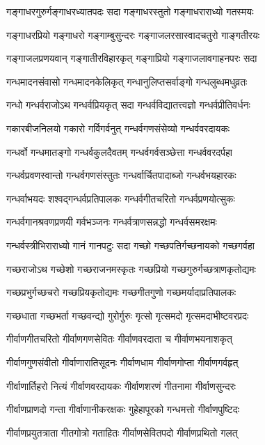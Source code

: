 \twolineshloka
{गङ्गाधरगुरुर्गङ्गाधरध्यातपदः सदा}
{गङ्गाधरस्तुतो गङ्गाधराराध्यो गतस्मयः}%

\twolineshloka
{गङ्गाधरप्रियो गङ्गाधरो गङ्गाम्बुसुन्दरः}%
{गङ्गाजलरसास्वादचतुरो गाङ्गतीरयः}%

\twolineshloka
{गङ्गाजलप्रणयवान् गङ्गातीरविहारकृत्}%
{गङ्गाप्रियो गङ्गाजलावगाहनपरः सदा}%

\twolineshloka
{गन्धमादनसंवासो गन्धमादनकेलिकृत्}%
{गन्धानुलिप्तसर्वाङ्गो गन्धलुब्धमधुव्रतः}%

\twolineshloka
{गन्धो गन्धर्वराजोऽथ गन्धर्वप्रियकृत् सदा}%
{गन्धर्वविद्यातत्त्वज्ञो गन्धर्वप्रीतिवर्धनः}%

\twolineshloka
{गकारबीजनिलयो गकारो गर्विगर्वनुत्}%
{गन्धर्वगणसंसेव्यो गन्धर्ववरदायकः}%

\twolineshloka
{गन्धर्वो गन्धमातङ्गो गन्धर्वकुलदैवतम्}%
{गन्धर्वगर्वसञ्छेत्ता गन्धर्ववरदर्पहा}%

\twolineshloka
{गन्धर्वप्रवणस्वान्तो गन्धर्वगणसंस्तुतः}%
{गन्धर्वार्चितपादाब्जो गन्धर्वभयहारकः}%

\twolineshloka
{गन्धर्वाभयदः शश्वद्गन्धर्वप्रतिपालकः}%
{गन्धर्वगीतचरितो गन्धर्वप्रणयोत्सुकः}%

\twolineshloka
{गन्धर्वगानश्रवणप्रणयी गर्वभञ्जनः}%
{गन्धर्वत्राणसन्नद्धो गन्धर्वसमरक्षमः}%

\twolineshloka
{गन्धर्वस्त्रीभिराराध्यो गानं गानपटुः सदा}%
{गच्छो गच्छपतिर्गच्छनायको गच्छगर्वहा}%

\twolineshloka
{गच्छराजोऽथ गच्छेशो गच्छराजनमस्कृतः}%
{गच्छप्रियो गच्छगुरुर्गच्छत्राणकृतोद्यमः}%

\twolineshloka
{गच्छप्रभुर्गच्छचरो गच्छप्रियकृतोद्यमः}%
{गच्छगीतगुणो गच्छमर्यादाप्रतिपालकः}%

\twolineshloka
{गच्छधाता गच्छभर्ता गच्छवन्द्यो गुरोर्गुरुः}%
{गृत्सो गृत्समदो गृत्समदाभीष्टवरप्रदः}%

\twolineshloka
{गीर्वाणगीतचरितो गीर्वाणगणसेवितः}%
{गीर्वाणवरदाता च गीर्वाणभयनाशकृत्}%

\twolineshloka
{गीर्वाणगुणसंवीतो गीर्वाणारातिसूदनः}%
{गीर्वाणधाम गीर्वाणगोप्ता गीर्वाणगर्वहृत्}%

\twolineshloka
{गीर्वाणार्तिहरो नित्यं गीर्वाणवरदायकः}%
{गीर्वाणशरणं गीतनामा गीर्वाणसुन्दरः}%

\twolineshloka
{गीर्वाणप्राणदो गन्ता गीर्वाणानीकरक्षकः}%
{गुहेहापूरको गन्धमत्तो गीर्वाणपुष्टिदः}%

\twolineshloka
{गीर्वाणप्रयुतत्राता गीतगोत्रो गताहितः}%
{गीर्वाणसेवितपदो गीर्वाणप्रथितो गलत्}%

